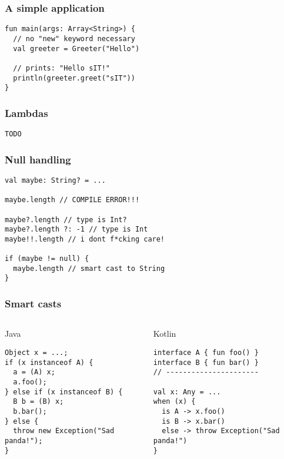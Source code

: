 \begin{frame}[fragile] \frametitle{A simple application}
\begin{lstlisting}
fun main(args: Array<String>) {
  // no "new" keyword necessary
  val greeter = Greeter("Hello")

  // prints: "Hello sIT!"
  println(greeter.greet("sIT"))
}
\end{lstlisting}
\end{frame}

\begin{frame}[fragile] \frametitle{Lambdas}
\begin{lstlisting}
TODO
\end{lstlisting}
\end{frame}

\begin{frame}[fragile] \frametitle{Null handling}
\begin{lstlisting}
val maybe: String? = ...

maybe.length // COMPILE ERROR!!!

maybe?.length // type is Int?
maybe?.length ?: -1 // type is Int
maybe!!.length // i dont f*cking care!

if (maybe != null) {
  maybe.length // smart cast to String
}
\end{lstlisting}
\end{frame}




\begin{frame}[fragile]
\frametitle{Smart casts}
\begin{columns}[t]
\begin{column}{0.5\textwidth}
\begin{center}
  Java
\end{center}
\begin{lstlisting}[style=twosided]
Object x = ...;
if (x instanceof A) {
  a = (A) x;
  a.foo();
} else if (x instanceof B) {
  B b = (B) x;
  b.bar();
} else {
  throw new Exception("Sad panda!");
}
\end{lstlisting}

\end{column}
\begin{column}{0.5\textwidth}
\begin{center}
  Kotlin
\end{center}
\begin{lstlisting}[style=twosided]
interface A { fun foo() }
interface B { fun bar() }
// ----------------------

val x: Any = ...
when (x) {
  is A -> x.foo()
  is B -> x.bar()
  else -> throw Exception("Sad panda!")
}
\end{lstlisting}
\end{column}
\end{columns}
\end{frame}

